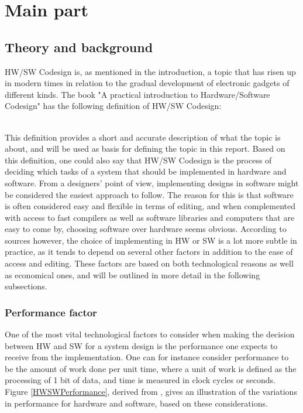 \chapter{Main part}
\section{Theory and background}

HW/SW Codesign is, as mentioned in the introduction, a topic that has risen up in modern times in relation to the gradual development of electronic gadgets of different kinds. The book "A practical introduction to Hardware/Software Codesign" \cite{IntroHWSW} has the following definition of HW/SW Codesign: 
\\\\
\begin{center}
\end{center}
\hfill\break
\hfill\break
\noindent
This definition provides a short and accurate description of what the topic is about, and will be used as basis for defining the topic in this report. Based on this definition, one could also say that HW/SW Codesign is the process of deciding which tasks of a system that should be implemented in hardware and software. 
From a designers' point of view, implementing designs in software might be considered the easiest approach to follow. The reason for this is that software is often considered easy and flexible in terms of editing, and when complemented with access to fast compilers as well as software libraries and computers that are easy to come by, choosing software over hardware seems obvious. According to sources however, the choice of implementing in HW or SW is a lot more subtle in practice, as it tends to depend on several other factors in addition to the ease of access and editing. These factors are based on both technological reasons as well as economical ones, and will be outlined in more detail in the following subsections. 
\\
\noindent
\subsection{Performance factor}
One of the most vital technological factors to consider when making the decision between HW and SW for a system design is the performance one expects to receive from the implementation. One can for instance consider performance to be the amount of work done per unit time, where a unit of work is defined as the processing of 1 bit of data, and time is measured in clock cycles or seconds. Figure \ref{HWSWPerformance}, derived from \cite{IntroHWSW}, gives an illustration of the variations in performance for hardware and software, based on these considerations. 

